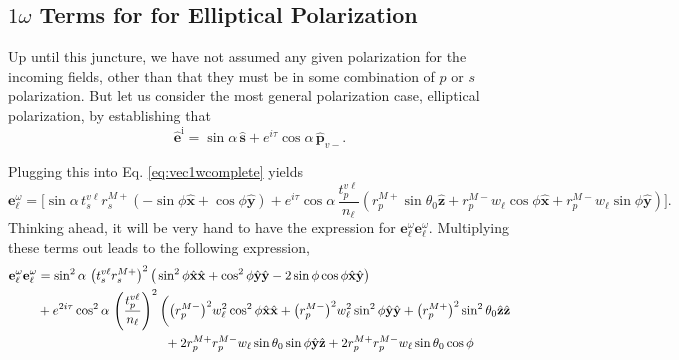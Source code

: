 \documentclass[aps,pra,10pt,amsmath,twocolumn,letterpaper]{revtex4-1}
\begin{document}
\subsection{\texorpdfstring{$1\omega$}{1w} Terms for for Elliptical
Polarization}

Up until this juncture, we have not assumed any given polarization for the
incoming fields, other than that they must be in some combination of $p$ or $s$
polarization. But let us consider the most general polarization case, elliptical
polarization, by establishing that \cite{byersPRB94}
\begin{equation}\label{eq:generalpol}
\hat{\mathbf{e}}^{\mathrm{i}}
= \sin\alpha\,\hat{\mathbf{s}}
+ e^{i\tau}\cos\alpha\,\hat{\mathbf{p}}_{v-}.
\end{equation}
\begin{widetext}
Plugging this into Eq. \eqref{eq:vec1wcomplete} yields
\begin{equation}\label{eq:newpol}
\mathbf{e}^{\omega}_{\ell}
=
\Bigg[
\sin\alpha\,
t^{v\ell}_{s} r^{M+}_{s}
\left(- \sin\phi\hat{\mathbf{x}} + \cos\phi\hat{\mathbf{y}}\right)
+
e^{i\tau}\cos\alpha\,
\frac{t^{v\ell}_{p}}{n_{\ell}}
\left( 
  r^{M+}_{p}\sin\theta_{0}\hat{\mathbf{z}}
+ r^{M-}_{p}w_{\ell}\cos\phi\hat{\mathbf{x}}
+ r^{M-}_{p}w_{\ell}\sin\phi\hat{\mathbf{y}}
\right)
\Bigg].
\end{equation}
Thinking ahead, it will be very hand to have the expression for
$\mathbf{e}^{\omega}_{\ell}\mathbf{e}^{\omega}_{\ell}$. Multiplying these terms
out leads to the following expression,
\begin{equation}\label{eq:nonmatrix}
\begin{split}
\mathbf{e}^{\omega}_{\ell}
\mathbf{e}^{\omega}_{\ell}
&=
\sin^{2}\alpha\,
\left(t^{v\ell}_{s}r^{M+}_{s}\right)^{2}
\big(
  \sin^{2}\phi\hat{\mathbf{x}}\hat{\mathbf{x}}
 + \cos^{2}\phi\hat{\mathbf{y}}\hat{\mathbf{y}}
 - 2\sin\phi\cos\phi\hat{\mathbf{x}}\hat{\mathbf{y}}
\big)\\
&+
e^{2i\tau} \cos^{2}\alpha\,
\left(\frac{t^{v\ell}_{p}}{n_{\ell}}\right)^{2}
\bigg(
\big(r^{M-}_{p}\big)^{2}w^{2}_{\ell}\cos^{2}\phi
    \hat{\mathbf{x}}\hat{\mathbf{x}}
  + \big(r^{M-}_{p}\big)^{2}w^{2}_{\ell}\sin^{2}\phi
    \hat{\mathbf{y}}\hat{\mathbf{y}}
  + \big(r^{M+}_{p}\big)^{2}\sin^{2}\theta_{0}
    \hat{\mathbf{z}}\hat{\mathbf{z}}\\
  &\hspace{3.5cm}+ 2r^{M+}_{p}r^{M-}_{p}w_{\ell}\sin\theta_{0}\sin\phi
    \hat{\mathbf{y}}\hat{\mathbf{z}}
  + 2r^{M+}_{p}r^{M-}_{p}w_{\ell}\sin\theta_{0}\cos\phi

\end{split}
\end{equation}
\end{widetext}
\end{document}
